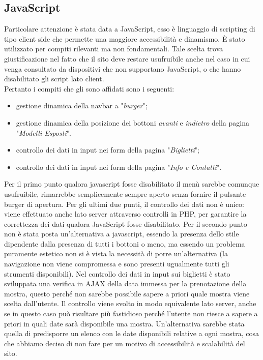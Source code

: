 \subsection{JavaScript}
Particolare attenzione è stata data a JavaScript, esso è linguaggio di scripting di tipo client side che permette una	maggiore accessibilità e dinamismo. È stato utilizzato per compiti rilevanti ma non fondamentali. Tale scelta trova giustificazione nel fatto che il sito deve restare usufruibile anche nel caso in cui venga consultato da dispositivi che non supportano JavaScript, o che hanno disabilitato gli script lato client.\\
Pertanto i compiti che gli sono affidati sono i seguenti:
\begin{itemize}
	\item gestione dinamica della navbar a "\textit{burger}";
	\item gestione dinamica della posizione dei bottoni \textit{avanti} e \textit{indietro} della pagina "\textit{Modelli Esposti}".
	\item controllo dei dati in input nei form della pagina "\textit{Biglietti}";
	\item controllo dei dati in input nei form della pagina "\textit{Info e Contatti}".
\end{itemize}
Per il primo punto qualora javascript fosse disabilitato il menù sarebbe comunque usufruibile, rimarrebbe semplicemente sempre aperto senza fornire il pulsante burger di apertura.
Per gli ultimi due punti, il controllo dei dati non è unico: viene effettuato anche lato server attraverso controlli in PHP, per garantire la correttezza dei dati qualora JavaScript fosse disabilitato.
Per il secondo punto non è stata posta un'alternativa a javascript, essendo la presenza dello stile dipendente dalla presenza di tutti i bottoni o meno, ma essendo un problema puramente estetico non si è vista la necessità di porre un'alternativa (la navigazione non viene compromessa e sono presenti ugualmente tutti gli strumenti disponibili).
Nel controllo dei dati in input sui biglietti è stato sviluppata una verifica in AJAX della data immessa per la prenotazione della mostra, questo perché non sarebbe possibile sapere a priori quale mostra viene scelta dall'utente.
Il controllo viene svolto in modo equivalente lato server, anche se in questo caso può risultare più fastidioso perché l'utente non riesce a sapere a priori in quali date sarà disponibile una mostra.
Un'alternativa sarebbe stata quella di predisporre un elenco con le date disponibili relative a ogni mostra, cosa che abbiamo deciso di non fare per un motivo di accessibilità e scalabilità del sito.